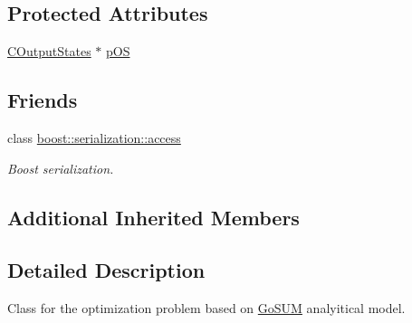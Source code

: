 \subsection*{Protected Attributes}
\begin{DoxyCompactItemize}
\item 
\hyperlink{class_go_s_u_m_1_1_c_output_states}{C\-Output\-States} $\ast$ \hyperlink{class_go_s_u_m_1_1_c_original_optimization_problem_a7c3c4d727506f3c503768d70c7fd0f73}{p\-O\-S}
\end{DoxyCompactItemize}
\subsection*{Friends}
\begin{DoxyCompactItemize}
\item 
class \hyperlink{class_go_s_u_m_1_1_c_original_optimization_problem_ac98d07dd8f7b70e16ccb9a01abf56b9c}{boost\-::serialization\-::access}
\begin{DoxyCompactList}\small\item\em Boost serialization. \end{DoxyCompactList}\end{DoxyCompactItemize}
\subsection*{Additional Inherited Members}


\subsection{Detailed Description}
Class for the optimization problem based on \hyperlink{struct_go_s_u_m}{Go\-S\-U\-M} analyitical model. 

